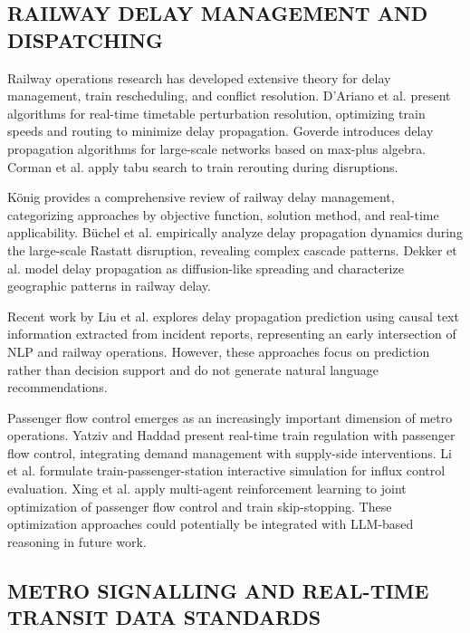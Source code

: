 \documentclass{IEEEoj}
\begin{document}
\subsection{RAILWAY DELAY MANAGEMENT AND DISPATCHING}

Railway operations research has developed extensive theory for delay management, train rescheduling, and conflict resolution. D'Ariano et al. \cite{dariano2007conflict} present algorithms for real-time timetable perturbation resolution, optimizing train speeds and routing to minimize delay propagation. Goverde \cite{goverde2010delay} introduces delay propagation algorithms for large-scale networks based on max-plus algebra. Corman et al. \cite{corman2010tabu} apply tabu search to train rerouting during disruptions.

K\"{o}nig \cite{konig2020review} provides a comprehensive review of railway delay management, categorizing approaches by objective function, solution method, and real-time applicability. B\"{u}chel et al. \cite{buchel2020empirical} empirically analyze delay propagation dynamics during the large-scale Rastatt disruption, revealing complex cascade patterns. Dekker et al. \cite{dekker2022modelling, dekker2021geographic} model delay propagation as diffusion-like spreading and characterize geographic patterns in railway delay.

Recent work by Liu et al. \cite{liu2023prediction, liu2023automatic} explores delay propagation prediction using causal text information extracted from incident reports, representing an early intersection of NLP and railway operations. However, these approaches focus on prediction rather than decision support and do not generate natural language recommendations.

Passenger flow control emerges as an increasingly important dimension of metro operations. Yatziv and Haddad \cite{yatziv2025realtime} present real-time train regulation with passenger flow control, integrating demand management with supply-side interventions. Li et al. \cite{li2025formulation} formulate train-passenger-station interactive simulation for influx control evaluation. Xing et al. \cite{xing2026joint} apply multi-agent reinforcement learning to joint optimization of passenger flow control and train skip-stopping. These optimization approaches could potentially be integrated with LLM-based reasoning in future work.

\subsection{METRO SIGNALLING AND REAL-TIME TRANSIT DATA STANDARDS}
\end{document}
